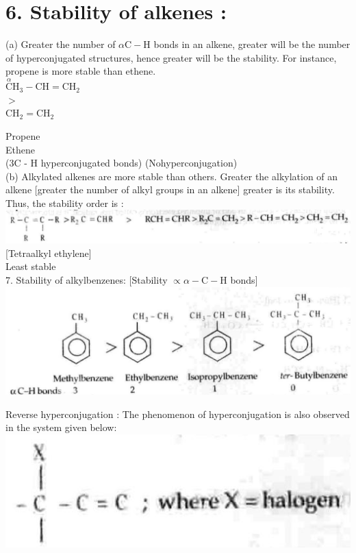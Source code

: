 \documentclass[10pt]{article}
\begin{document}
\section*{6. Stability of alkenes :}
(a) Greater the number of $\alpha \mathrm{C}-\mathrm{H}$ bonds in an alkene, greater will be the number of hyperconjugated structures, hence greater will be the stability. For instance, propene is more stable than ethene.\\
$\stackrel{\alpha}{\mathrm{C}} \mathrm{H}_{3}-\mathrm{CH}=\mathrm{CH}_{2}$\\
$>$\\
$\mathrm{CH}_{2}=\mathrm{CH}_{2}$

Propene\\
Ethene\\
(3C - H hyperconjugated bonds) (Nohyperconjugation)\\[0pt]
(b) Alkylated alkenes are more stable than others. Greater the alkylation of an alkene [greater the number of alkyl groups in an alkene] greater is its stability. Thus, the stability order is :\\
\includegraphics[max width=\textwidth, center]{2025_01_28_8470952b98110cec3aabg-083}\\[0pt]
[Tetraalkyl ethylene]\\
Least stable\\
7. Stability of alkylbenzenes: [Stability $\propto \alpha-\mathrm{C}-\mathrm{H}$ bonds]\\
\includegraphics[max width=\textwidth, center]{2025_01_28_8470952b98110cec3aabg-083(2)}

Reverse hyperconjugation : The phenomenon of hyperconjugation is also observed in the system given below:\\
\includegraphics[max width=\textwidth, center]{2025_01_28_8470952b98110cec3aabg-083(3)}
\end{document}
